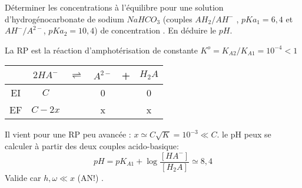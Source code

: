\begin{Exercise}[title=]
	Déterminer les concentrations à l'équilibre pour une solution d'hydrogénocarbonate de sodium $NaHCO_3$ (couples $AH_2/AH^-$ , $pKa_1=6,4$ et $AH^-/A^{2-}$, $pKa_2=10,4$) de concentration . En déduire le $pH$.

\end{Exercise}
\begin{Answer}
	La RP est la réaction d'amphotérisation de constante $K^o=K_{A2}/K_{A1} =10^{-4}<1$
	\begin{center}
		\begin{tabular}{cccccc}
		&$2HA^-$&$\rightleftharpoons$& $A^{2-}$ & +& $H_2A$ \\
		 \hline
	 EI & $C$  	& 					 &	0		&  &0\\
		 \hline
	 EF & $C-2x$&					 & x 		&  &x\\
	\end{tabular}
	\end{center}
Il vient pour une RP peu avancée : $x \simeq C \sqrt{K} =10^{-3} \ll C$.
le pH peux se calculer à partir des deux couples acido-basique:
\[pH = pK_{A1}+\log\frac{[HA^-]}{[H_2A]}\simeq 8,4 \]
Valide car $h, \omega \ll x$ (AN!) .

\end{Answer}
